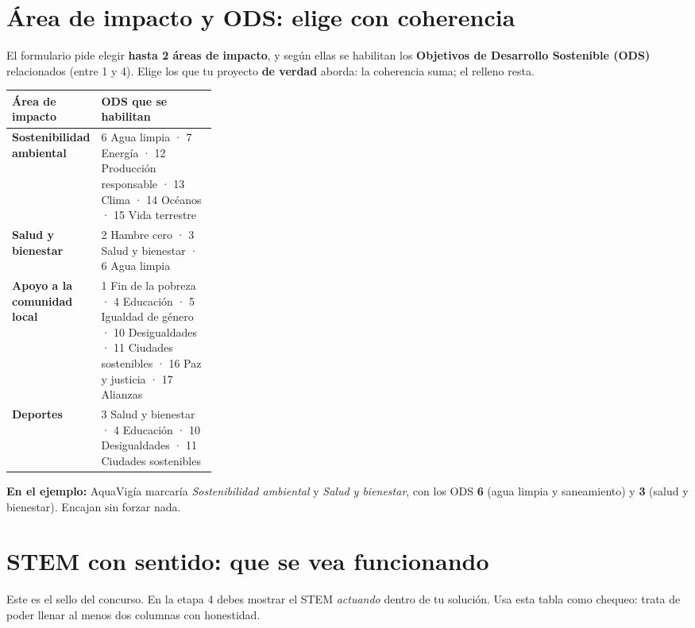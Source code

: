 \documentclass[11pt, letterpaper]{article}
\begin{document}
\section{Área de impacto y ODS: elige con coherencia}

El formulario pide elegir \textbf{hasta 2 áreas de impacto}, y según ellas se habilitan los \textbf{Objetivos de Desarrollo Sostenible (ODS)} relacionados (entre 1 y 4). Elige los que tu proyecto \textbf{de verdad} aborda: la coherencia suma; el relleno resta.

\begin{center}
\renewcommand{\arraystretch}{1.3}
\begin{tabularx}{\linewidth}{@{}p{0.30\linewidth} X@{}}
\toprule
\textbf{\color{smjAzul}Área de impacto} & \textbf{\color{smjAzul}ODS que se habilitan}\\
\midrule
\textbf{Sostenibilidad ambiental} & 6 Agua limpia · 7 Energía · 12 Producción responsable · 13 Clima · 14 Océanos · 15 Vida terrestre\\
\textbf{Salud y bienestar} & 2 Hambre cero · 3 Salud y bienestar · 6 Agua limpia\\
\textbf{Apoyo a la comunidad local} & 1 Fin de la pobreza · 4 Educación · 5 Igualdad de género · 10 Desigualdades · 11 Ciudades sostenibles · 16 Paz y justicia · 17 Alianzas\\
\textbf{Deportes} & 3 Salud y bienestar · 4 Educación · 10 Desigualdades · 11 Ciudades sostenibles\\
\bottomrule
\end{tabularx}
\end{center}

\noindent\textbf{En el ejemplo:} AquaVigía marcaría \emph{Sostenibilidad ambiental} y \emph{Salud y bienestar}, con los ODS \textbf{6} (agua limpia y saneamiento) y \textbf{3} (salud y bienestar). Encajan sin forzar nada.

\section{STEM con sentido: que se vea funcionando}

Este es el sello del concurso. En la etapa 4 debes mostrar el STEM \emph{actuando} dentro de tu solución. Usa esta tabla como chequeo: trata de poder llenar al menos dos columnas con honestidad.
\end{document}

